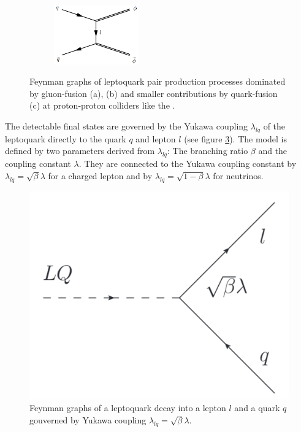 \begin{figure}
\begin{subfigure}[t]{0.9\textwidth}
                \includegraphics[width=0.4\textwidth]{figures/qff.pdf}
                \label{qfc}
                \end{subfigure}
%
\caption[Feynman graphs of leptoquark pair production processes at proton-proton colliders like the {\LHC}.]{Feynman graphs of leptoquark pair production processes dominated by gluon-fusion (a), (b) and smaller contributions by quark-fusion (c) at proton-proton colliders like the {\LHC}. \cite{hunter}}
\label{LQpairs}
\end{figure}
%
%
%
%
%
The detectable final states are governed by the Yukawa coupling $\lambda_{lq}$ of the leptoquark directly to the quark $q$ and lepton $l$ (see figure \ref{YukawaLQ}). The model is defined by two parameters derived from $\lambda_{lq}$: The branching ratio $\beta$ and the coupling constant $\lambda$. They are connected to the Yukawa coupling constant by $\lambda_{lq}=\sqrt{\beta}\lambda$ for a charged lepton and by $\lambda_{lq}=\sqrt{1-\beta}\lambda$ for neutrinos. \cite{currentStatus:13TeVATLAS}\par
%
\begin{figure}[htbp]                                 
 \begin{center}                                       
  \includegraphics[width=0.4\linewidth]{figures/yukawa.pdf} 
   \caption[Feynman graph of a leptoquark decay governed by Yukawa coupling.]{Feynman graphs of a leptoquark decay into a lepton $l$ and a quark $q$ gouverned by Yukawa coupling $\lambda_{lq}=\sqrt{\beta}\lambda$. \cite{currentStatus:13TeVATLAS}}
  \label{YukawaLQ}                                     
 \end{center}
\end{figure}
